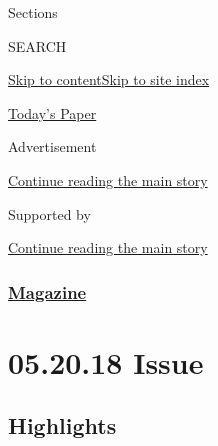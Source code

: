Sections

SEARCH

\protect\hyperlink{site-content}{Skip to
content}\protect\hyperlink{site-index}{Skip to site index}

\href{https://myaccount.nytimes3xbfgragh.onion/auth/login?response_type=cookie\&client_id=vi}{}

\href{https://www.nytimes3xbfgragh.onion/section/todayspaper}{Today's
Paper}

Advertisement

\protect\hyperlink{after-top}{Continue reading the main story}

Supported by

\protect\hyperlink{after-sponsor}{Continue reading the main story}

\hypertarget{magazine}{%
\subsubsection{\texorpdfstring{\href{/section/magazine}{Magazine}}{Magazine}}\label{magazine}}

\hypertarget{052018-issue}{%
\section{05.20.18 Issue}\label{052018-issue}}

\hypertarget{highlights}{%
\subsection{Highlights}\label{highlights}}

